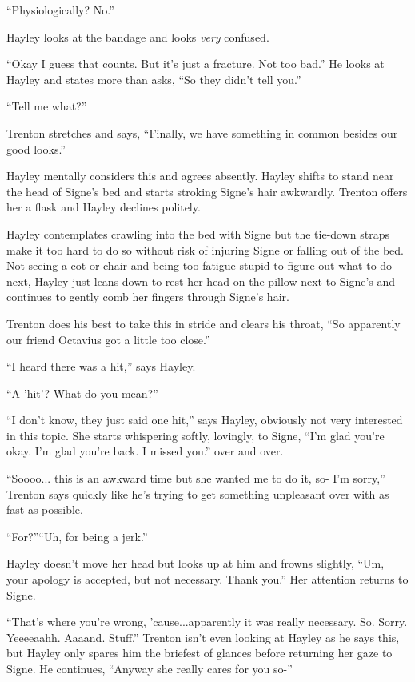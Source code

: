``Physiologically?  No.''

Hayley looks at the bandage and looks \textit{very} confused.

``Okay I guess that counts.  But it's just a fracture.  Not too bad.''  He looks at Hayley and states more than asks, ``So they didn't tell you.''

``Tell me what?''

Trenton stretches and says, ``Finally, we have something in common besides our good looks.''

Hayley mentally considers this and agrees absently.  Hayley shifts to stand near the head of Signe's bed and starts stroking Signe's hair awkwardly.  Trenton offers her a flask and Hayley declines politely.

Hayley contemplates crawling into the bed with Signe but the tie-down straps make it too hard to do so without risk of injuring Signe or falling out of the bed.  Not seeing a cot or chair and being too fatigue-stupid to figure out what to do next, Hayley just leans down to rest her head on the pillow next to Signe's and continues to gently comb her fingers through Signe's hair.  



Trenton does his best to take this in stride and clears his throat, ``So apparently our friend Octavius got a little too close.''

``I heard there was a hit,'' says Hayley.

``A 'hit'?  What do you mean?''

``I don't know, they just said one hit,'' says Hayley, obviously not very interested in this topic. She starts whispering softly, lovingly, to Signe, ``I'm glad you're okay.  I'm glad you're back.  I missed you.'' over and over.



``Soooo... this is an awkward time but she wanted me to do it, so- I'm sorry,'' Trenton says quickly like he's trying to get something unpleasant over with as fast as possible.

``For?''``Uh, for being a jerk.''

Hayley doesn't move her head but looks up at him and frowns slightly, ``Um, your apology is accepted, but not necessary.  Thank you.''  Her attention returns to Signe.

``That's where you're wrong, 'cause...apparently it was really necessary.  So.  Sorry.  Yeeeeaahh.  Aaaand.  Stuff.''  Trenton isn't even looking at Hayley as he says this, but Hayley only spares him the briefest of glances before returning her gaze to Signe.   He continues, ``Anyway she really cares for you so-''

